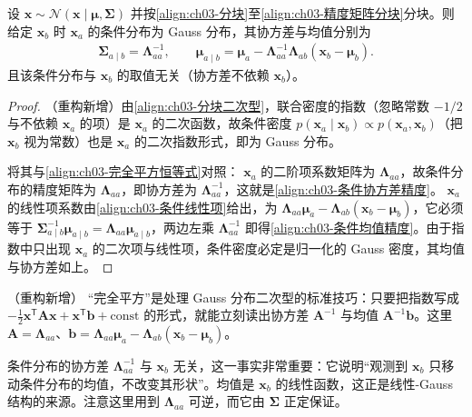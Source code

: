 \documentclass[../../main.tex]{subfiles}
\begin{document}
\begin{proposition}\label{proposition:ch03-条件Gauss精度}
设 $\boldsymbol{x}\sim\mathcal{N}(\boldsymbol{x}\mid\boldsymbol{\mu},\boldsymbol{\Sigma})$ 并按\eqref{align:ch03-分块}至\eqref{align:ch03-精度矩阵分块}分块。则给定 $\boldsymbol{x}_{b}$ 时 $\boldsymbol{x}_{a}$ 的条件分布为 Gauss 分布，其协方差与均值分别为
\begin{align*}
\boldsymbol{\Sigma}_{a\mid b}=\boldsymbol{\Lambda}_{aa}^{-1},\qquad \boldsymbol{\mu}_{a\mid b}=\boldsymbol{\mu}_{a}-\boldsymbol{\Lambda}_{aa}^{-1}\boldsymbol{\Lambda}_{ab}(\boldsymbol{x}_{b}-\boldsymbol{\mu}_{b}).
\end{align*}
且该条件分布与 $\boldsymbol{x}_{b}$ 的取值无关（协方差不依赖 $\boldsymbol{x}_{b}$）。
\end{proposition}
\begin{proof}
（重构新增）由\eqref{align:ch03-分块二次型}，联合密度的指数（忽略常数 $-1/2$ 与不依赖 $\boldsymbol{x}_a$ 的项）是 $\boldsymbol{x}_{a}$ 的二次函数，故条件密度 $p(\boldsymbol{x}_{a}\mid\boldsymbol{x}_{b})\propto p(\boldsymbol{x}_{a},\boldsymbol{x}_{b})$（把 $\boldsymbol{x}_{b}$ 视为常数）也是 $\boldsymbol{x}_{a}$ 的二次指数形式，即为 Gauss 分布。

将其与\eqref{align:ch03-完全平方恒等式}对照： $\boldsymbol{x}_{a}$ 的二阶项系数矩阵为 $\boldsymbol{\Lambda}_{aa}$，故条件分布的精度矩阵为 $\boldsymbol{\Lambda}_{aa}$，即协方差为 $\boldsymbol{\Lambda}_{aa}^{-1}$，这就是\eqref{align:ch03-条件协方差精度}。 $\boldsymbol{x}_{a}$ 的线性项系数由\eqref{align:ch03-条件线性项}给出，为 $\boldsymbol{\Lambda}_{aa}\boldsymbol{\mu}_{a}-\boldsymbol{\Lambda}_{ab}(\boldsymbol{x}_{b}-\boldsymbol{\mu}_{b})$，它必须等于 $\boldsymbol{\Sigma}_{a\mid b}^{-1}\boldsymbol{\mu}_{a\mid b}=\boldsymbol{\Lambda}_{aa}\boldsymbol{\mu}_{a\mid b}$，两边左乘 $\boldsymbol{\Lambda}_{aa}^{-1}$ 即得\eqref{align:ch03-条件均值精度}。由于指数中只出现 $\boldsymbol{x}_{a}$ 的二次项与线性项，条件密度必定是归一化的 Gauss 密度，其均值与协方差如上。
\end{proof}

\begin{remark}（重构新增）
“完全平方”是处理 Gauss 分布二次型的标准技巧：只要把指数写成 $-\frac12\boldsymbol{x}^{\mathsf{T}}\boldsymbol{A}\boldsymbol{x}+\boldsymbol{x}^{\mathsf{T}}\boldsymbol{b}+\text{const}$ 的形式，就能立刻读出协方差 $\boldsymbol{A}^{-1}$ 与均值 $\boldsymbol{A}^{-1}\boldsymbol{b}$。这里 $\boldsymbol{A}=\boldsymbol{\Lambda}_{aa}$、$\boldsymbol{b}=\boldsymbol{\Lambda}_{aa}\boldsymbol{\mu}_{a}-\boldsymbol{\Lambda}_{ab}(\boldsymbol{x}_{b}-\boldsymbol{\mu}_{b})$。

条件分布的协方差 $\boldsymbol{\Lambda}_{aa}^{-1}$ 与 $\boldsymbol{x}_{b}$ 无关，这一事实非常重要：它说明“观测到 $\boldsymbol{x}_b$ 只移动条件分布的均值，不改变其形状”。均值是 $\boldsymbol{x}_{b}$ 的线性函数，这正是线性-Gauss 结构的来源。注意这里用到 $\boldsymbol{\Lambda}_{aa}$ 可逆，而它由 $\boldsymbol{\Sigma}$ 正定保证。
\end{remark}
\end{document}

